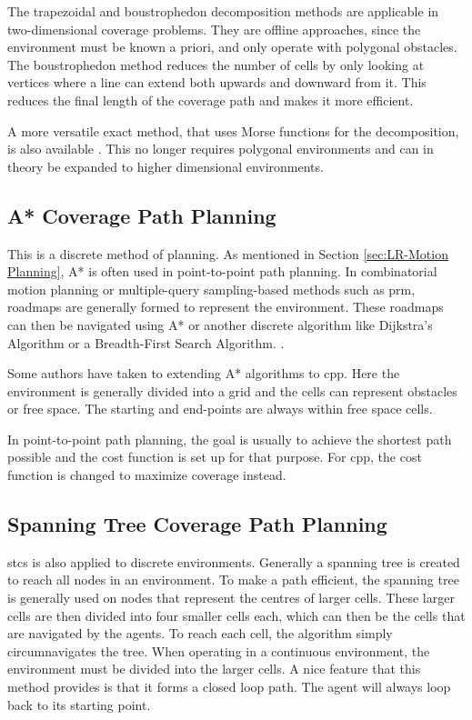 The trapezoidal and boustrophedon decomposition methods are applicable in two-dimensional coverage problems. They are offline approaches, since the environment must be known a priori, and only operate with polygonal obstacles. The boustrophedon method reduces the number of cells by only looking at vertices where a line can extend both upwards and downward from it. This reduces the final length of the coverage path and makes it more efficient. \cite{CPP-Survey-2013} 

A more versatile exact method, that uses Morse functions for the decomposition, is also available \cite{Choset-Morse2000}. This no longer requires polygonal environments and can in theory be expanded to higher dimensional environments.
\subsection{A* Coverage Path Planning}
This is a discrete method of planning. As mentioned in Section \ref{sec:LR-Motion Planning}, A* is often used in point-to-point path planning. In combinatorial motion planning or multiple-query sampling-based methods such as \ac{prm}, roadmaps are generally formed to represent the environment. These roadmaps can then be navigated using A* or another discrete algorithm like Dijkstra's Algorithm or a Breadth-First Search Algorithm. \cite{Lavalle2006}.

Some authors have taken to extending A* algorithms to \ac{cpp}. Here the environment is generally divided into a grid and the cells can represent obstacles or free space. The starting and end-points are always within free space cells.

In point-to-point path planning, the goal is usually to achieve the shortest path possible and the cost function is set up for that purpose. For \ac{cpp}, the cost function is changed to maximize coverage instead.
\subsection{Spanning Tree Coverage Path Planning}
\label{sec:lit SR CPP - STC}
\acp{stc} is also applied to discrete environments. Generally a spanning tree is created to reach all nodes in an environment. To make a path efficient, the spanning tree is generally used on nodes that represent the centres of larger cells. These larger cells are then divided into four smaller cells each, which can then be the cells that are navigated by the agents. To reach each cell, the algorithm simply circumnavigates the tree. When operating in a continuous environment, the environment must be divided into the larger cells. A nice feature that this method provides is that it forms a closed loop path. The agent will always loop back to its starting point. 
